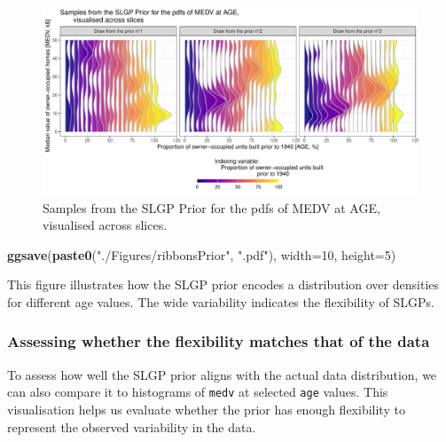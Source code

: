 \documentclass[
]{article}
\newenvironment{Shaded}{\begin{snugshade}}{\end{snugshade}}
\newcommand{\AttributeTok}[1]{\textcolor[rgb]{0.13,0.29,0.53}{#1}}
\newcommand{\DecValTok}[1]{\textcolor[rgb]{0.00,0.00,0.81}{#1}}
\newcommand{\FunctionTok}[1]{\textcolor[rgb]{0.13,0.29,0.53}{\textbf{#1}}}
\newcommand{\NormalTok}[1]{#1}
\newcommand{\StringTok}[1]{\textcolor[rgb]{0.31,0.60,0.02}{#1}}
\begin{document}
\begin{figure}[H]

{\centering \includegraphics{IntroductionSLGP_files/figure-latex/SLGPplottingPrior1-1} 

}

\caption{Samples from the SLGP Prior for the pdfs of MEDV at AGE, visualised across slices.}\label{fig:SLGPplottingPrior1}
\end{figure}

\begin{Shaded}
\begin{Highlighting}[]
\FunctionTok{ggsave}\NormalTok{(}\FunctionTok{paste0}\NormalTok{(}\StringTok{"./Figures/ribbonsPrior"}\NormalTok{,  }\StringTok{".pdf"}\NormalTok{), }\AttributeTok{width=}\DecValTok{10}\NormalTok{, }\AttributeTok{height=}\DecValTok{5}\NormalTok{)}
\end{Highlighting}
\end{Shaded}

This figure illustrates how the SLGP prior encodes a distribution over densities for different age values. The wide variability indicates the flexibility of SLGPs.

\subsubsection{Assessing whether the flexibility matches that of the data}\label{assessing-whether-the-flexibility-matches-that-of-the-data}

To assess how well the SLGP prior aligns with the actual data distribution, we can also compare it to histograms of \texttt{medv} at selected \texttt{age} values. This visualisation helps us evaluate whether the prior has enough flexibility to represent the observed variability in the data.
\end{document}
